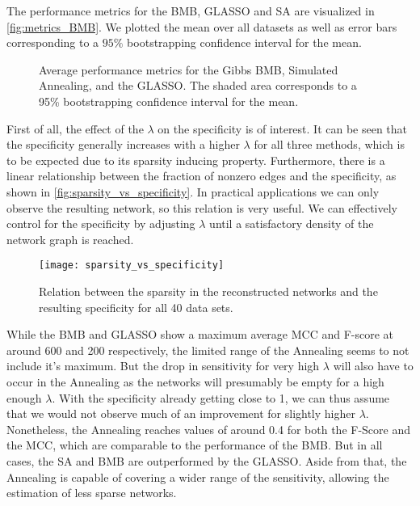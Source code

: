 The performance metrics for the \gls{BMB}, GLASSO and \gls{SA} are visualized in \autoref{fig:metrics_BMB}.
We plotted the mean over all datasets as well as error bars corresponding to a $95\%$ bootstrapping confidence interval for the mean.
\begin{figure}
	\centering
	\caption{Average performance metrics for the Gibbs BMB, Simulated Annealing, and the GLASSO.
		The shaded area corresponds to a 95\% bootstrapping confidence interval for the mean.}
	\label{fig:metrics_BMB}
\end{figure}
First of all, the effect of the $\lambda$ on the specificity is of interest.
It can be seen that the specificity generally increases with a higher $\lambda$ for all three methods, which is to be expected due to its sparsity inducing property.
Furthermore, there is a linear relationship between the fraction of nonzero edges and the specificity, as shown in \autoref{fig:sparsity_vs_specificity}.
In practical applications we can only observe the resulting network, so this relation is very useful.
We can effectively control for the specificity by adjusting $\lambda$ until a satisfactory density of the network graph is reached.
\begin{figure}
	\centering
	\texttt{[image: sparsity\_vs\_specificity]}
	\caption{Relation between the sparsity in the reconstructed networks and the resulting specificity for all 40 data sets.}
	\label{fig:sparsity_vs_specificity}
\end{figure}
While the BMB and GLASSO show a maximum average MCC and F-score at around 600 and 200 respectively, the limited range of the Annealing seems to not include it's maximum.
But the drop in sensitivity for very high $\lambda$ will also have to occur in the Annealing as the networks will presumably be empty for a high enough $\lambda$.
With the specificity already getting close to 1, we can thus assume that we would not observe much of an improvement for slightly higher $\lambda$.
Nonetheless, the Annealing reaches values of around 0.4 for both the F-Score and the MCC, which are comparable to the performance of the BMB.
But in all cases, the SA and BMB are outperformed by the GLASSO.
Aside from that, the Annealing is capable of covering a wider range of the sensitivity, allowing the estimation of less sparse networks.

